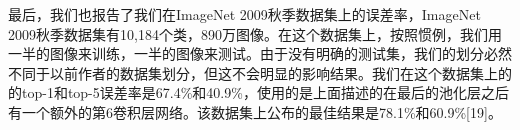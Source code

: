 最后，我们也报告了我们在ImageNet 2009秋季数据集上的误差率，ImageNet 2009秋季数据集有10,184个类，890万图像。在这个数据集上，按照惯例，我们用一半的图像来训练，一半的图像来测试。由于没有明确的测试集，我们的划分必然不同于以前作者的数据集划分，但这不会明显的影响结果。我们在这个数据集上的的top-1和top-5误差率是67.4\%和40.9\%，使用的是上面描述的在最后的池化层之后有一个额外的第6卷积层网络。该数据集上公布的最佳结果是78.1\%和60.9\%[19]。\\

